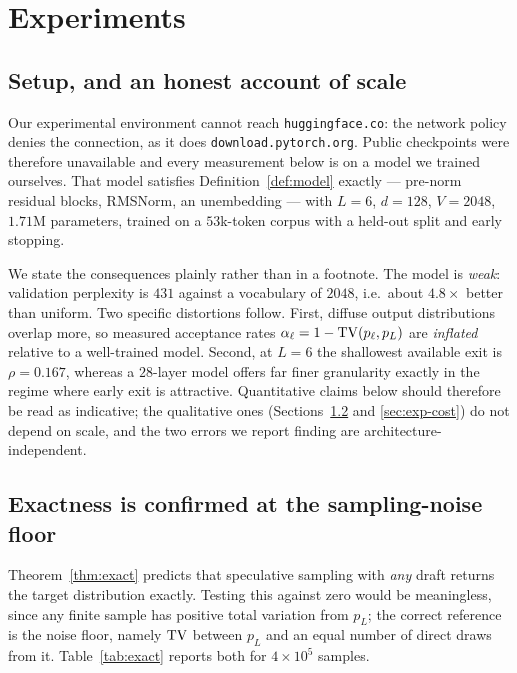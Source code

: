 \section{Experiments}
\label{sec:experiments}

\subsection{Setup, and an honest account of scale}

Our experimental environment cannot reach \texttt{huggingface.co}: the network
policy denies the connection, as it does \texttt{download.pytorch.org}. Public
checkpoints were therefore unavailable and every measurement below is on a model
we trained ourselves. That model satisfies Definition~\ref{def:model} exactly ---
pre-norm residual blocks, RMSNorm, an unembedding --- with $L=6$, $d=128$,
$V=2048$, $1.71$M parameters, trained on a $53$k-token corpus with a held-out
split and early stopping.

We state the consequences plainly rather than in a footnote. The model is
\emph{weak}: validation perplexity is $431$ against a vocabulary of $2048$, i.e.\
about $4.8\times$ better than uniform. Two specific distortions follow. First,
diffuse output distributions overlap more, so measured acceptance rates
$\alpha_\ell = 1 - \mathrm{TV}(p_\ell,p_L)$ are \emph{inflated} relative to a
well-trained model. Second, at $L=6$ the shallowest available exit is
$\rho = 0.167$, whereas a $28$-layer model offers far finer granularity exactly
in the regime where early exit is attractive. Quantitative claims below should
therefore be read as indicative; the qualitative ones
(Sections~\ref{sec:exp-exact} and \ref{sec:exp-cost}) do not depend on scale, and
the two errors we report finding are architecture-independent.

\subsection{Exactness is confirmed at the sampling-noise floor}
\label{sec:exp-exact}

Theorem~\ref{thm:exact} predicts that speculative sampling with \emph{any} draft
returns the target distribution exactly. Testing this against zero would be
meaningless, since any finite sample has positive total variation from $p_L$; the
correct reference is the noise floor, namely $\mathrm{TV}$ between $p_L$ and an equal
number of direct draws from it. Table~\ref{tab:exact} reports both for
$4\times10^{5}$ samples.

